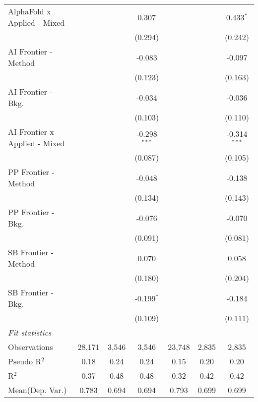 \begin{tabular}{lcccccc}
   AlphaFold x Applied - Mixed   &               &               & 0.307          &                &         & 0.433$^{*}$\\   
                                 &               &               & (0.294)        &                &         & (0.242)\\   
   AI Frontier - Method          &               &               & -0.083         &                &         & -0.097\\   
                                 &               &               & (0.123)        &                &         & (0.163)\\   
   AI Frontier - Bkg.            &               &               & -0.034         &                &         & -0.036\\   
                                 &               &               & (0.103)        &                &         & (0.110)\\   
   AI Frontier x Applied - Mixed &               &               & -0.298$^{***}$ &                &         & -0.314$^{***}$\\   
                                 &               &               & (0.087)        &                &         & (0.105)\\   
   PP Frontier - Method          &               &               & -0.048         &                &         & -0.138\\   
                                 &               &               & (0.134)        &                &         & (0.143)\\   
   PP Frontier - Bkg.            &               &               & -0.076         &                &         & -0.070\\   
                                 &               &               & (0.091)        &                &         & (0.081)\\   
   SB Frontier - Method          &               &               & 0.070          &                &         & 0.058\\   
                                 &               &               & (0.180)        &                &         & (0.204)\\   
   SB Frontier - Bkg.            &               &               & -0.199$^{*}$   &                &         & -0.184\\   
                                 &               &               & (0.109)        &                &         & (0.111)\\   
   \midrule
   \emph{Fit statistics}\\
   Observations                  & 28,171        & 3,546         & 3,546          & 23,748         & 2,835   & 2,835\\  
   Pseudo R$^2$                  & 0.18          & 0.24          & 0.24           & 0.15           & 0.20    & 0.20\\  
   R$^2$                         & 0.37          & 0.48          & 0.48           & 0.32           & 0.42    & 0.42\\  
Mean(Dep. Var.) & 0.783 & 0.694 & 0.694 & 0.793 & 0.699 & 0.699 \\
   

\end{tabular}
